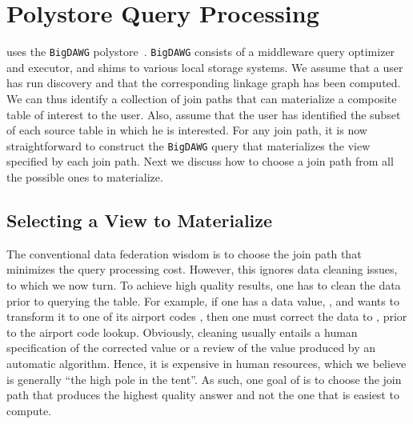 \section{Polystore Query Processing}
\label{sec:curating}

\dcv uses the \texttt{BigDAWG} polystore~\cite{DBLP:journals/pvldb/ElmoreDSBCGHHKK15}. \texttt{BigDAWG} consists of a middleware query optimizer and executor, and shims to various local storage systems. We assume that a user has run discovery and that the corresponding linkage graph has been computed. We can thus identify a collection of join paths that can materialize a composite table of interest to the user. Also, assume that the user has identified the subset of each source table in which he is interested. For any join path, it is now straightforward to construct the \texttt{BigDAWG} query that materializes the view specified by each join path. Next we discuss how to choose a join path from all the possible ones to materialize.
	



\subsection{Selecting a View to Materialize}

The conventional data federation wisdom is to choose the join path that minimizes the query processing cost. However, this ignores data cleaning issues, to which we now turn. To achieve high quality results, one has to clean the data prior to querying the table. For example, if one has a data value, , and wants to transform it to one of its airport codes , then one must correct the data to , prior to the airport code lookup. Obviously, cleaning usually entails a human specification of the corrected value or a review of the value produced by an automatic algorithm. Hence, it is expensive in human resources, which we believe is generally ``the high pole in the tent''. As such, one goal of \dcv is to choose the join path that produces the highest quality answer and not the one that is easiest to compute. 

